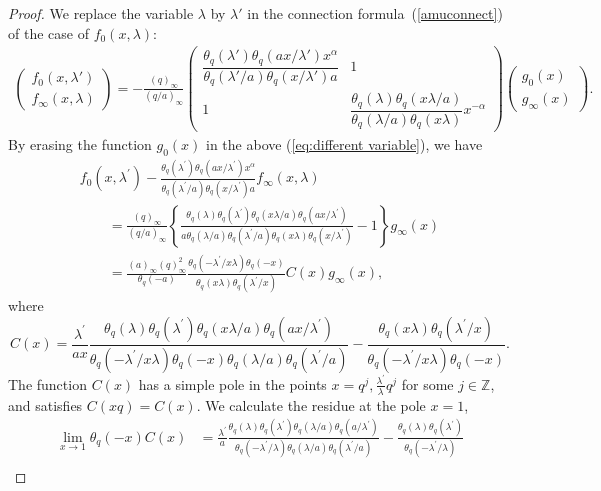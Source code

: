\documentclass[10pt,a4paper]{article}
\numberwithin{equation}{section}
\theoremstyle{definition}
\newcommand{\Zz}{\mathbb{Z}}
\begin{document}
\begin{proof}
We replace the variable $\lambda$ by $\lambda'$ in the connection formula~(\ref{amuconnect}) of the case of $f_0(x,\lambda)$:
\begin{gather}
\label{eq:different variable}
\begin{pmatrix}f_0(x,\lambda')\\ f_{\infty }(x,\lambda) \end{pmatrix}=-\frac{(q)_\infty}{(q/a)_\infty}\begin{pmatrix}\dfrac{\theta_q(\lambda')\theta_q(ax/\lambda')x^\alpha}{\theta_q(\lambda'/a)\theta_q(x/\lambda')a}&1\\ 1&\dfrac{\theta_q(\lambda)\theta_q(x\lambda/a)}{\theta_q(\lambda/a)\theta_q(x\lambda)}x^{-\alpha}\end{pmatrix}\begin{pmatrix}g_0(x)\\g_\infty(x)\end{pmatrix}.
\end{gather}
By erasing the function $g_0(x)$ in the above (\ref{eq:different variable}), we have
\begin{gather*}
f_0(x,\lambda^{\prime})-\frac{\theta_q(\lambda^{\prime})\theta_q(ax/\lambda^{\prime})x^\alpha}{\theta_q(\lambda^{\prime}/a)\theta_q(x/\lambda^{\prime})a}f_{\infty}(x,\lambda)\\
\qquad=\frac{(q)_\infty}{(q/a)_\infty}\left\{\frac{\theta_q(\lambda)\theta_q(\lambda^{\prime})\theta_q(x\lambda/a)\theta_q(ax/\lambda^{\prime})}{a\theta_q(\lambda/a)\theta_q(\lambda^{\prime}/a)\theta_q(x\lambda)\theta_q(x/\lambda^{\prime})}-1\right\}g_\infty(x)\\
\qquad =\frac{(a)_\infty(q)_\infty^2}{\theta_q(-a)}\frac{\theta_q(-\lambda^{\prime}/x\lambda)\theta_q(-x)}{\theta_q(x\lambda)\theta_q(\lambda^{\prime}/x)}C(x)g_\infty(x),
\end{gather*}
where
\[
C(x)=\frac{\lambda^{\prime}}{ax}\frac{\theta_q(\lambda)\theta_q(\lambda^{\prime})\theta_q(x\lambda/a)\theta_q(ax/\lambda^{\prime})} {\theta_q(-\lambda^{\prime}/x\lambda)\theta_q(-x)\theta_q(\lambda/a)\theta_q(\lambda^{\prime}/a)}-\frac{\theta_q(x\lambda) \theta_q(\lambda^{\prime}/x)}{\theta_q(-\lambda^{\prime}/x\lambda)\theta_q(-x)}.
\]
The function $C(x)$ has a simple pole in the points $x=q^j,\frac{\lambda^{\prime}}{\lambda}q^j$ for some $j\in\Zz$, and satisfies $C(xq)=C(x)$. We calculate the residue at the pole $x=1$,
\begin{align*}
\lim_{x\to1}\theta_q(-x)C(x)&=\frac{\lambda^{\prime}}{a}\frac{\theta_q(\lambda)\theta_q (\lambda^{\prime})\theta_q(\lambda/a)\theta_q(a/\lambda^{\prime})}{\theta_q(-\lambda^{\prime}/\lambda)\theta_q(\lambda/a)\theta_q(\lambda^{\prime}/a)} -\frac{\theta_q(\lambda)\theta_q(\lambda^{\prime})}{\theta_q(-\lambda^{\prime}/\lambda)}\\

\end{align*}
\end{proof}
\end{document}

